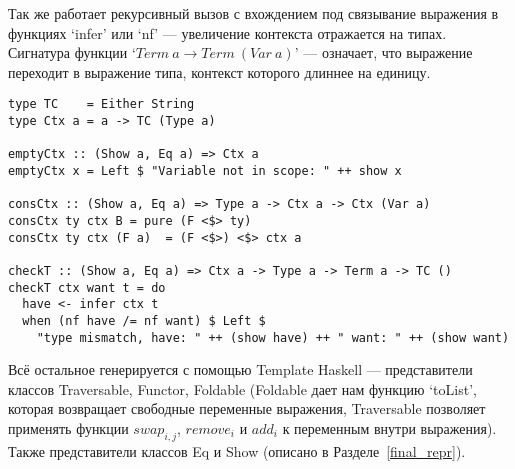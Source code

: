 Так же работает рекурсивный вызов с вхождением под связывание выражения в функциях `infer' или `nf' --- увеличение контекста отражается на типах. Сигнатура функции `$Term\ a \rightarrow Term\ (Var\ a)$' --- означает, что выражение переходит в выражение типа, контекст которого длиннее на единицу.

\begin{lstlisting}[caption={Проверка типов и контексты},captionpos=b, frame=single, float,floatplacement=H, label={lst_checkT}]
type TC    = Either String
type Ctx a = a -> TC (Type a)

emptyCtx :: (Show a, Eq a) => Ctx a
emptyCtx x = Left $ "Variable not in scope: " ++ show x

consCtx :: (Show a, Eq a) => Type a -> Ctx a -> Ctx (Var a)
consCtx ty ctx B = pure (F <$> ty)
consCtx ty ctx (F a)  = (F <$>) <$> ctx a

checkT :: (Show a, Eq a) => Ctx a -> Type a -> Term a -> TC ()
checkT ctx want t = do
  have <- infer ctx t
  when (nf have /= nf want) $ Left $
    "type mismatch, have: " ++ (show have) ++ " want: " ++ (show want)
\end{lstlisting}

Всё остальное генерируется с помощью Template Haskell\cite{TH} --- представители классов Traversable\cite{deriveFun}, Functor, Foldable (Foldable дает нам функцию `toList', которая возвращает свободные переменные выражения, Traversable позволяет применять функции $swap_{i,j}$, $remove_i$ и $add_i$ к переменным внутри выражения). Также представители классов Eq и Show (описано в Разделе~\ref{final_repr}).


